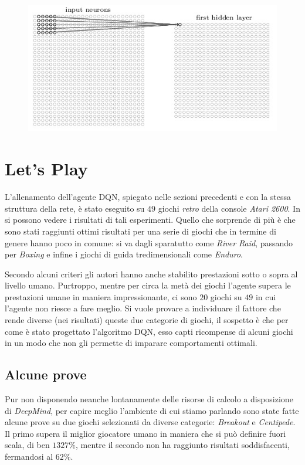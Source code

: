 \documentclass[twoside,twocolumn,10pt]{extarticle}
\theoremstyle{definition}
\begin{document}
\begin{figure}[h]
	\centering
	\includegraphics[scale=.5]{images/hlayer.jpeg}
	\caption{}
	\label{fig:hlayer}
\end{figure}

\section{Let's Play}\label{}
	L'allenamento dell'agente DQN, spiegato nelle sezioni precedenti e con la stessa struttura della rete, è stato eseguito su $49$ giochi \textit{retro} della console \textit{Atari 2600}. In \cite{bib:dqn} si possono vedere i risultati di tali esperimenti. Quello che sorprende di più è che sono stati raggiunti ottimi risultati per una serie di giochi che in termine di genere hanno poco in comune: si va dagli sparatutto come \textit{River Raid}, passando per \textit{Boxing} e infine i giochi di guida tredimensionali come \textit{Enduro}.
	
	Secondo alcuni criteri gli autori hanno anche stabilito prestazioni sotto o sopra al livello umano. Purtroppo, mentre per circa la metà dei giochi l'agente supera le prestazioni umane in maniera impressionante, ci sono $20$ giochi su $49$ in cui l'agente non riesce a fare meglio. Si vuole provare a individuare il fattore che rende diverse (nei risultati) queste due categorie di giochi, il sospetto è che per come è stato progettato l'algoritmo DQN, esso capti ricompense di alcuni giochi in un modo che non gli permette di imparare comportamenti ottimali.
	
	\subsection{Alcune prove}
		Pur non disponendo neanche lontanamente delle risorse di calcolo a disposizione di \textit{DeepMind}, per capire meglio l'ambiente di cui stiamo parlando sono state fatte alcune prove su due giochi selezionati da diverse categorie: \textit{Breakout} e \textit{Centipede}. Il primo supera il miglior giocatore umano in maniera che si può definire fuori scala, di ben $1327\%$, mentre il secondo non ha raggiunto risultati soddisfacenti, fermandosi al $62\%$.
\end{document}
